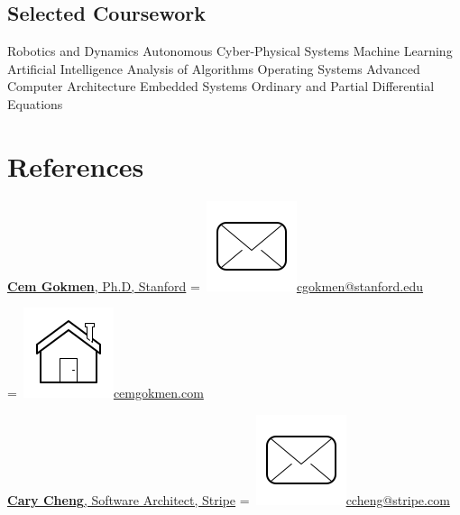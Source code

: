 \documentclass[]{plushcv}
\begin{document}
\begin{minipage}[t]{0.25\textwidth}
\sectionsep
\sectionsep

\subsection{Selected Coursework}
Robotics and Dynamics \textbullet{} Autonomous Cyber-Physical Systems \textbullet{} Machine Learning \textbullet{} Artificial Intelligence \textbullet{} Analysis of Algorithms \textbullet{} Operating Systems \textbullet{} Advanced Computer Architecture \textbullet{} Embedded Systems \textbullet{} Ordinary and Partial Differential Equations


\section{References} 
\href{https://www.linkedin.com/in/cgokmen/}{\textbf{Cem Gokmen}, Ph.D, Stanford}
\begingroup
{}=\hbox{
\includegraphics[scale=0.1,trim={0 1cm 0cm 0cm}]{icons/main/mail.png}\hspace{0.3cm}\href{mailto:cgokmen@stanford.edu}{cgokmen@stanford.edu}
}
\parbox{\wd0}{}
\endgroup

\begingroup
{}=\hbox{
\includegraphics[scale=0.1,trim={0 1.25cm -0.4cm 0cm}]{icons/main/home.png}\hspace{0.26cm}\href{https://www.cemgokmen.com/}{cemgokmen.com}
}
\parbox{\wd0}{}
\endgroup

\sectionsep

\href{https://www.linkedin.com/in/carycheng/}{\textbf{Cary Cheng}, Software Architect, Stripe}
\begingroup
{}=\hbox{
\includegraphics[scale=0.1,trim={0 1cm 0cm 0cm}]{icons/main/mail.png}\hspace{0.3cm}\href{mailto:ccheng@stripe.com}{ccheng@stripe.com}
}
\parbox{\wd0}{}
\endgroup


\end{minipage}
\end{document}
